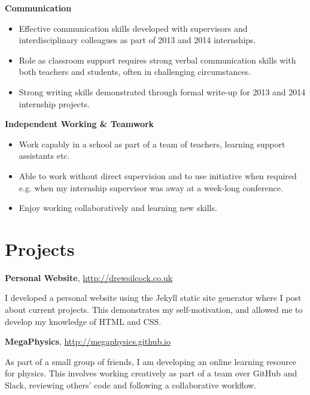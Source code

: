 \documentclass[11pt,a4paper,sans]{moderncv}
\begin{document}
\vspace{1em}

{\large\textbf{Communication}}

\begin{itemize}
\item Effective communication skills developed with supervisors and
    interdisciplinary colleagues as part of 2013 and 2014 internships.
\item Role as classroom support requires strong verbal communication skills with
    both teachers and students, often in challenging circumstances.
\item Strong writing skills demonstrated through formal write-up for 2013 and
    2014 internship projects.
\end{itemize}

\vspace{1em}

{\large\textbf{Independent Working \& Teamwork}}

\begin{itemize}
\item Work capably in a school as part of a team of teachers, learning support
    assistants etc.
\item Able to work without direct supervision and to use initiative when
    required e.g. when my internship supervisor was away at a week-long
    conference.
\item Enjoy working collaboratively and learning new skills.
\end{itemize}

\section{Projects}

{\large\textbf{Personal Website}, \color{blue}
\href{http://drewsilcock.co.uk}{http://drewsilcock.co.uk}}

I developed a personal website using the Jekyll static site generator where I
post about current projects. This demonstrates my self-motivation, and allowed
me to develop my knowledge of HTML and CSS.

\vspace{0.75em}

{\large\textbf{MegaPhysics}, \color{blue}
\href{http://megaphysics.github.io}{http://megaphysics.github.io}}

As part of a small group of friends, I am developing an online learning resource
for physics. This involves working creatively as part of a team over GitHub and
Slack, reviewing others' code and following a collaborative workflow.
\end{document}
